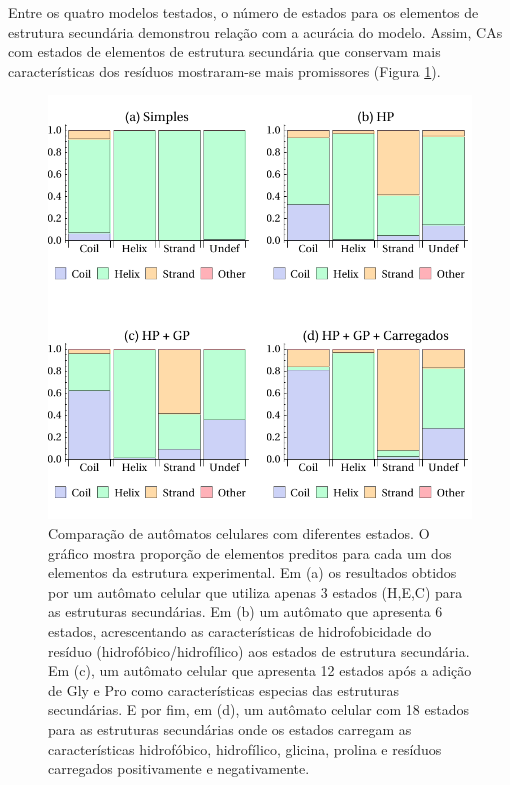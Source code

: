 

Entre os quatro modelos testados, o número de estados para os elementos de estrutura secundária demonstrou relação com a acurácia do modelo. Assim, CAs com estados de elementos de estrutura secundária que conservam mais características dos resíduos mostraram-se mais promissores (Figura \ref{fig:ca_errors}).

\begin{figure}
  \centering
  \includegraphics[width=.9\textwidth]{figures/chamel_errors_ca.pdf}
  \caption{Comparação de autômatos celulares com diferentes estados. O gráfico mostra proporção de elementos preditos para cada um dos elementos da estrutura experimental. Em (a) os resultados obtidos por um autômato celular que utiliza apenas 3 estados (H,E,C) para as estruturas secundárias. Em (b) um autômato que apresenta 6 estados, acrescentando as características de hidrofobicidade do resíduo (hidrofóbico/hidrofílico) aos estados de estrutura secundária. Em (c), um autômato celular que apresenta 12 estados após a adição de Gly e Pro como características especias das estruturas secundárias. E por fim, em (d), um autômato celular com 18 estados para as estruturas secundárias onde os estados carregam as características hidrofóbico, hidrofílico, glicina, prolina e resíduos carregados positivamente e negativamente.} 
        \label{fig:ca_errors}
\end{figure}

